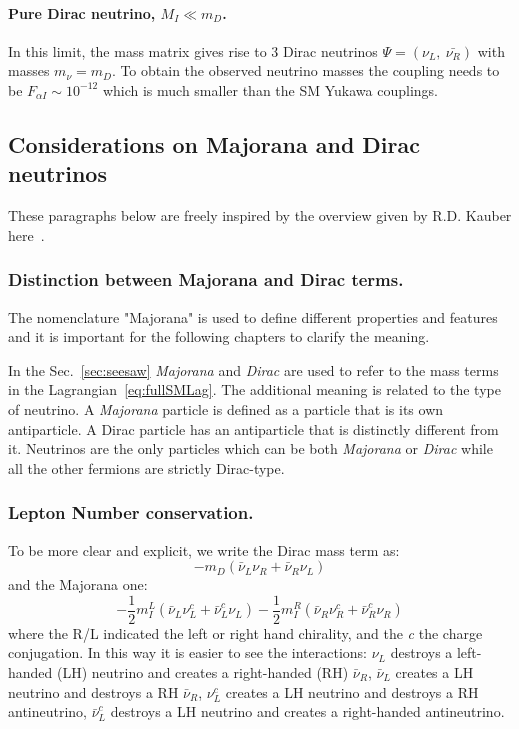 \paragraph {Pure Dirac neutrino, $M_I \ll m_D$.}
In this limit, the mass matrix gives rise to 3 Dirac neutrinos $\Psi = (\nu_L,\:\bar{\nu_R})$ with masses $m_\nu = m_D$. To obtain the observed neutrino masses the coupling needs to be $F_{\alpha I} \sim 10^{-12}$ which is much smaller than the SM Yukawa couplings.

\vspace{5mm} 
\subsection{Considerations on Majorana and Dirac neutrinos}\label{sec:c3majo_dirac}
These paragraphs below are freely inspired by the overview given by R.D. Kauber here~\cite{webpage_seesaw}.
\subsubsection {Distinction between Majorana and Dirac terms.}\label{sec:majo_dirac}
The nomenclature "Majorana" is used to define different properties and features and it is important for the following chapters to clarify the meaning.

In the Sec.~\ref{sec:seesaw} \emph{Majorana} and \emph{Dirac} are used to refer to the mass terms in the Lagrangian~\ref{eq:fullSMLag}. The additional meaning is related to the type of neutrino. A \emph{Majorana} particle is defined as a particle that is its own antiparticle.  A Dirac particle has an antiparticle that is distinctly different from it. Neutrinos are the only particles which can be both \emph{Majorana} or \emph{Dirac} while all the other fermions are strictly Dirac-type. 

\subsubsection{Lepton Number conservation.}\label{sec:lnv_lnc}
To be more clear and explicit, we write the Dirac mass term as:
\begin{equation}
\label{eq:dirac}
-m_D (\bar{\nu}_L\nu_R + \bar{\nu}_R\nu_L)
\end{equation}
and the Majorana one:
\begin{equation}
\label{eq:majorana}
-\frac{1}{2}m^{L}_{I}(\bar{\nu}_L\nu^{c}_L + \bar{\nu}_L^{c}\nu_L) -\frac{1}{2}m^{R}_{I} (\bar{\nu}_R\nu^{c}_R + \bar{\nu}_R^{c}\nu_R)
\end{equation}
where the R/L indicated the left or right hand chirality, and the \emph{c} the charge conjugation.
In this way it is easier to see the interactions: $\nu_L$ destroys a left-handed (LH) neutrino and creates a right-handed (RH) $\bar{\nu}_R$, $\bar{\nu}_L$
 creates a LH neutrino and destroys a RH $\bar{\nu}_R$, $\nu^{c}_L$ creates a LH neutrino and destroys a RH antineutrino, $\bar{\nu}^{c}_L$ destroys a LH
 neutrino and creates a right-handed antineutrino.

